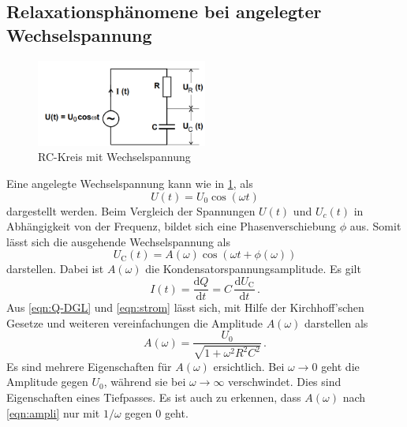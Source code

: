 \subsection{Relaxationsphänomene bei angelegter Wechselspannung}
\begin{figure}
    \centering
    \caption{RC-Kreis mit Wechselspannung} 
    \label{fig:Wechs}
    \includegraphics[width = 0.5\textwidth]{pics/wechselspannung-RC.png}
\end{figure}
Eine angelegte Wechselspannung kann wie in \ref{fig:Wechs}, als 
\begin{equation*}
    U(t)=U_0 \cos(\omega t)
\end{equation*}
dargestellt werden. Beim Vergleich der Spannungen $U(t)$ und $U_c(t)$ in Abhängigkeit von der Frequenz, bildet sich eine Phasenverschiebung $\phi$ aus.
Somit lässt sich die ausgehende Wechselspannung als
\begin{equation}
    U_\text{C}(t)= A(\omega) \cos (\omega t + \phi (\omega))
\end{equation}
darstellen. Dabei ist $A(\omega)$ die Kondensatorspannungsamplitude.
Es gilt 
\begin{equation}
    \label{eqn:strom}
    I(t)= \frac{\text{d}Q}{\text{d}t}=C\, \frac{\text{d}U_\text{C}}{\text{d}t}\, .
\end{equation}
Aus \eqref{eqn:Q-DGL} und \eqref{eqn:strom} lässt sich, mit Hilfe der Kirchhoff'schen Gesetze 
und weiteren vereinfachungen die Amplitude $A(\omega)$ darstellen als
\begin{equation}
    \label{eqn:ampli}
    A(\omega)=\frac{U_0}{\sqrt{1+\omega^2 R^2 C^2}} \, .
\end{equation}
Es sind mehrere Eigenschaften für $A(\omega)$ ersichtlich. Bei $\omega \rightarrow 0$ geht die Amplitude gegen $U_0$, während sie bei 
$\omega \rightarrow \infty$ verschwindet. Dies sind Eigenschaften eines Tiefpasses. Es ist auch zu erkennen, dass $A(\omega)$ nach \eqref{eqn:ampli}
nur mit $1/\omega$ gegen $0$ geht.
